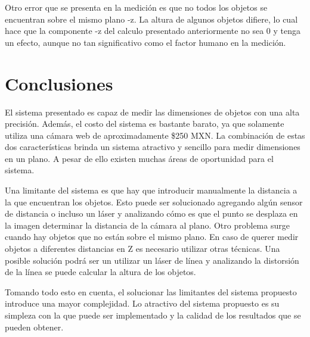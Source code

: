 \documentclass[]{article}
\begin{document}
Otro error que se presenta en la medición es que no todos los objetos se encuentran sobre el mismo plano -z. La altura de algunos objetos difiere, lo cual hace que la componente -z del calculo presentado anteriormente no sea 0 y tenga un efecto, aunque no tan significativo como el factor humano en la medición.


\section{Conclusiones}

El sistema presentado es capaz de medir las dimensiones de objetos con una alta precisión. Además, el costo del sistema es bastante barato, ya que solamente utiliza una cámara web de aproximadamente \$250 MXN. La combinación de estas dos características brinda un sistema atractivo y sencillo para medir dimensiones en un plano. A pesar de ello existen muchas áreas de oportunidad para el 
sistema.

Una limitante del sistema es que hay que introducir manualmente la distancia a la que encuentran los objetos. Esto puede ser solucionado agregando algún sensor de distancia o incluso un láser y analizando cómo es que el punto se desplaza en la imagen determinar la distancia de la cámara al plano. Otro problema surge cuando hay objetos que no están sobre el mismo plano. En caso de querer medir objetos a diferentes distancias en Z es necesario utilizar otras técnicas. Una posible solución podrá ser un utilizar un láser de línea y analizando la distorsión de la línea se puede calcular la altura de los objetos.

Tomando todo esto en cuenta, el solucionar las limitantes del sistema propuesto introduce una mayor complejidad. Lo atractivo del sistema propuesto es su simpleza con la que puede ser implementado y la calidad de los resultados que se pueden obtener.

\nocite{a}
\nocite{b}
\nocite{c}
\nocite{d}
\nocite{e}
\nocite{f}

{\raggedright}


\end{document}
